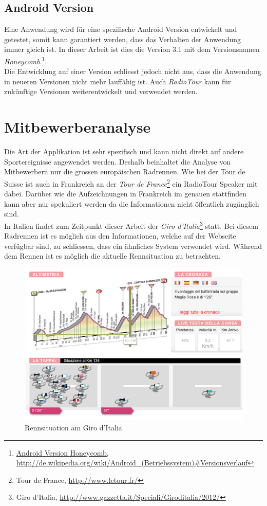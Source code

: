 \subsection{Android Version}
Eine Anwendung wird für eine spezifische Android Version entwickelt und getestet, somit kann garantiert werden, dass das Verhalten der Anwendung  immer gleich ist. In dieser Arbeit ist dies die Version 3.1 mit dem Versionsnamen \textit{Honeycomb}.\footnote{\url{Android Version Honeycomb, http://de.wikipedia.org/wiki/Android_(Betriebssystem)\#Versionsverlauf}}.
\\
Die Entwicklung auf einer Version schliesst jedoch nicht aus, dass die Anwendung in neueren Versionen nicht mehr lauffähig ist. Auch \textit{RadioTour} kann für zukünftige Versionen weiterentwickelt und verwendet werden.

\section{Mitbewerberanalyse}
Die Art der Applikation ist sehr spezifisch und kann nicht direkt auf andere Sportereignisse angewendet werden. Deshalb beinhaltet die Analyse von Mitbewerbern nur die grossen europäischen Radrennen. Wie bei der Tour de Suisse ist auch in Frankreich an der \textit{Tour de France}\footnote{Tour de France, \url{http://www.letour.fr/}} ein RadioTour Speaker mit dabei. Darüber wie die Aufzeichnungen in Frankreich im genauen stattfinden kann aber nur spekuliert werden da die Informationen nicht öffentlich zugänglich sind.
\\
In Italien findet zum Zeitpunkt dieser Arbeit der \textit{Giro d'Italia}\footnote{Giro d'Italia, \url{http://www.gazzetta.it/Speciali/Giroditalia/2012/}} statt. Bei diesem Radrennen ist es möglich aus den Informationen, welche auf der Webseite verfügbar sind, zu schliessen, dass ein ähnliches System verwendet wird. Während dem Rennen ist es möglich die aktuelle Rennsituation zu betrachten.

\begin{figure}[h!]
\caption{Rennsituation am Giro d'Italia}
\label{fig:giro}
\includegraphics[scale=0.7]{05bericht/images/giro.png}
\end{figure} 

